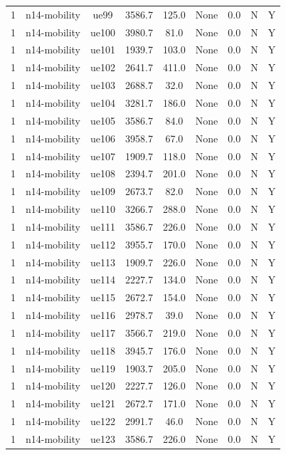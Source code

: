 \begin{table}[ht]
\begin{tabular}{|c|c|c|c|c|c|c|c|c|}
1 & n14-mobility & ue99 & 3586.7 & 125.0 & None & 0.0 & N & Y \\
1 & n14-mobility & ue100 & 3980.7 & 81.0 & None & 0.0 & N & Y \\
1 & n14-mobility & ue101 & 1939.7 & 103.0 & None & 0.0 & N & Y \\
1 & n14-mobility & ue102 & 2641.7 & 411.0 & None & 0.0 & N & Y \\
1 & n14-mobility & ue103 & 2688.7 & 32.0 & None & 0.0 & N & Y \\
1 & n14-mobility & ue104 & 3281.7 & 186.0 & None & 0.0 & N & Y \\
1 & n14-mobility & ue105 & 3586.7 & 84.0 & None & 0.0 & N & Y \\
1 & n14-mobility & ue106 & 3958.7 & 67.0 & None & 0.0 & N & Y \\
1 & n14-mobility & ue107 & 1909.7 & 118.0 & None & 0.0 & N & Y \\
1 & n14-mobility & ue108 & 2394.7 & 201.0 & None & 0.0 & N & Y \\
1 & n14-mobility & ue109 & 2673.7 & 82.0 & None & 0.0 & N & Y \\
1 & n14-mobility & ue110 & 3266.7 & 288.0 & None & 0.0 & N & Y \\
1 & n14-mobility & ue111 & 3586.7 & 226.0 & None & 0.0 & N & Y \\
1 & n14-mobility & ue112 & 3955.7 & 170.0 & None & 0.0 & N & Y \\
1 & n14-mobility & ue113 & 1909.7 & 226.0 & None & 0.0 & N & Y \\
1 & n14-mobility & ue114 & 2227.7 & 134.0 & None & 0.0 & N & Y \\
1 & n14-mobility & ue115 & 2672.7 & 154.0 & None & 0.0 & N & Y \\
1 & n14-mobility & ue116 & 2978.7 & 39.0 & None & 0.0 & N & Y \\
1 & n14-mobility & ue117 & 3566.7 & 219.0 & None & 0.0 & N & Y \\
1 & n14-mobility & ue118 & 3945.7 & 176.0 & None & 0.0 & N & Y \\
1 & n14-mobility & ue119 & 1903.7 & 205.0 & None & 0.0 & N & Y \\
1 & n14-mobility & ue120 & 2227.7 & 126.0 & None & 0.0 & N & Y \\
1 & n14-mobility & ue121 & 2672.7 & 171.0 & None & 0.0 & N & Y \\
1 & n14-mobility & ue122 & 2991.7 & 46.0 & None & 0.0 & N & Y \\
1 & n14-mobility & ue123 & 3586.7 & 226.0 & None & 0.0 & N & Y \\

\end{tabular}
\end{table}
